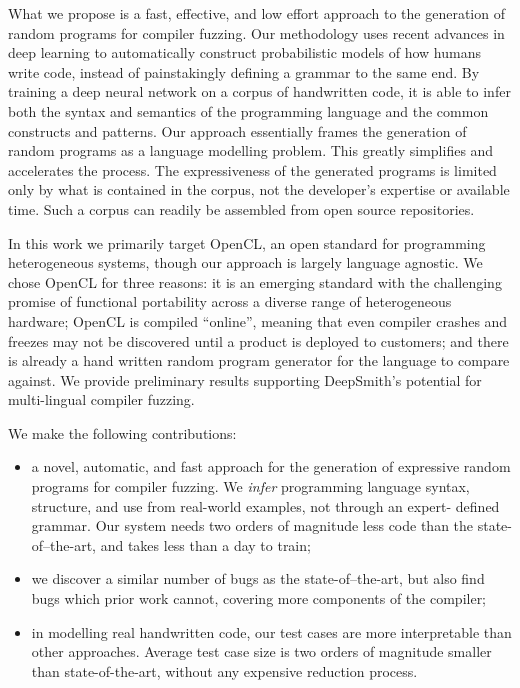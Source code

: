 What we propose is a fast, effective, and low effort approach to the generation
of random programs for compiler fuzzing. Our methodology uses recent advances in
deep learning to automatically construct probabilistic models of how humans
write code, instead of painstakingly defining a grammar to the same end. By
training a deep neural network on a corpus of handwritten code, it is able to
infer both the syntax and semantics of the programming language and the common
constructs and patterns. Our approach essentially frames the generation of
random programs as a language modelling problem. This greatly simplifies and
accelerates the process. The expressiveness of the generated programs is limited
only by what is contained in the corpus, not the developer's expertise or
available time. Such a corpus can readily be assembled from open source
repositories.

In this work we primarily target OpenCL, an open standard for programming
heterogeneous systems, though our approach is largely language agnostic. We
chose OpenCL for three reasons: it is an emerging standard with the challenging
promise of functional portability across a diverse range of heterogeneous
hardware; OpenCL is compiled ``online'', meaning that even compiler crashes and
freezes may not be discovered until a product is deployed to customers; and
there is already a hand written random program generator for the language to
compare against. We provide preliminary results supporting DeepSmith's potential
for multi-lingual compiler fuzzing.

We make the following contributions:
%
\begin{itemize}
  \item a novel, automatic, and fast approach for the generation of expressive
  random programs for compiler fuzzing. We \emph{infer} programming language
  syntax, structure, and use from real-world examples, not through an expert-
  defined grammar. Our system needs two orders of magnitude less code than the
  state-of–the-art, and takes less than a day to train;

  \item we discover a similar number of bugs as the state-of–the-art, but also
  find bugs which prior work cannot, covering more components of the compiler;

  \item in modelling real handwritten code, our test cases are more
  interpretable than other approaches. Average test case size is two orders of
  magnitude smaller than state-of-the-art, without any expensive reduction
  process.
\end{itemize}

